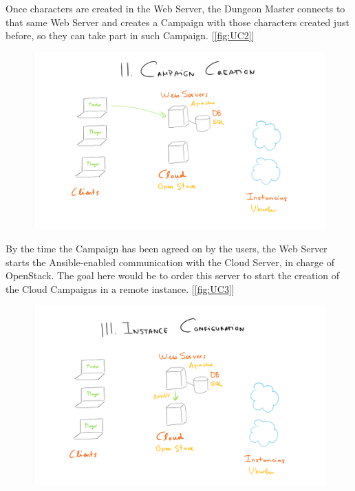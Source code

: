 \documentclass[a4paper,12pt]{report}
\begin{document}
Once characters are created in the Web Server, the Dungeon Master connects to that same Web Server and creates a Campaign with those characters created just before, so they can take part in such Campaign. [\autoref{fig:UC2}]

\begin{figure}[h!]
\caption{}
\centering
\includegraphics[width=1\textwidth]{images/Phase2.png}
\label{fig:UC2}
\end{figure}


By the time the Campaign has been agreed on by the users, the Web Server starts the Ansible-enabled communication with the Cloud Server, in charge of OpenStack. The goal here would be to order this server to start the creation of the Cloud Campaigns in a remote instance. [\autoref{fig:UC3}]

\begin{figure}[h!]
\caption{}
\centering
\includegraphics[width=1\textwidth]{images/Phase3.png}
\label{fig:UC3}
\end{figure}
\end{document}
